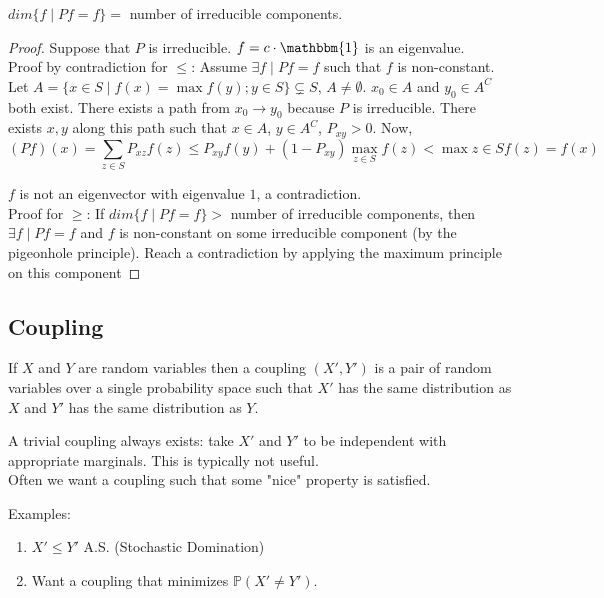 \documentclass[english, course]{Notes}
\begin{document}
\begin{theorem}
	$dim \{f \mid Pf = f\} = $ number of irreducible components.
\end{theorem}

\begin{proof}
	Suppose that $P$ is irreducible. $f = c \cdot \mathbbm{1}$ is an eigenvalue. \\
	
	Proof by contradiction for $\leq$: Assume $\exists f \mid Pf = f$ such that $f$ is non-constant. Let $A = \{x \in S \mid f(x) = \max f(y); y \in S\} \subsetneq S$, $A \neq \emptyset$. $x_0 \in A$ and $y_0 \in A^C$ both exist. There exists a path from $x_0 \to y_0$ because $P$ is irreducible. There exists $x, y$ along this path such that $x  \in A$, $y \in A^C$, $P_{xy} > 0$. Now,
	\[(Pf)(x) = \sum_{z \in S} P_{xz} f(z) \leq P_{xy}f(y) + (1 - P_{xy}) \max_{z \in S} f(z) < \max{z \in S} f(z) = f(x)\]
	
	$f$ is not an eigenvector with eigenvalue $1$, a contradiction.\\
	
	Proof for $\geq$: If $dim\{f \mid Pf = f\} >$ number of irreducible components, then $\exists f \mid Pf = f$ and $f$ is non-constant on some irreducible component (by the pigeonhole principle). Reach a contradiction by applying the maximum principle on this component 
\end{proof}

\subsection{Coupling}

\begin{definition}[Coupling]
	If $X$ and $Y$ are random variables then a coupling $(X', Y')$ is a pair of random variables over a single probability space such that $X'$ has the same distribution as $X$ and $Y'$ has the same distribution as $Y$.
\end{definition}

\begin{remark}
	A trivial coupling always exists: take $X'$ and $Y'$ to be independent with appropriate marginals. This is typically not useful.\\
	
	Often we want a coupling such that some "nice" property is satisfied.
\end{remark}

Examples:
\begin{enumerate}
	\item $X' \leq Y'$ A.S. (Stochastic Domination)
	\item Want a coupling that minimizes $\mathbb{P}(X' \neq Y')$.
\end{enumerate}
\end{document}
